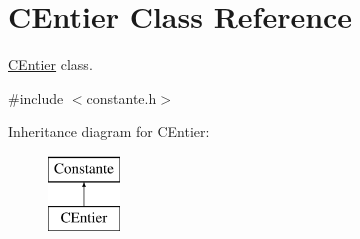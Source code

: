 \hypertarget{class_c_entier}{\section{C\-Entier Class Reference}
\label{class_c_entier}
}


\hyperlink{class_c_entier}{C\-Entier} class.  




{\ttfamily \#include $<$constante.\-h$>$}

Inheritance diagram for C\-Entier\-:\begin{figure}[H]
\begin{center}
\leavevmode
\includegraphics[height=2.000000cm]{class_c_entier}
\end{center}
\end{figure}
